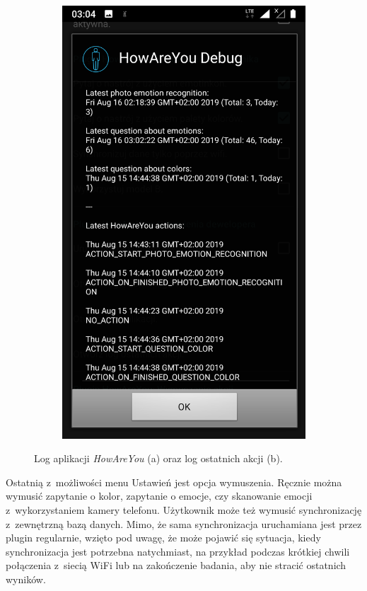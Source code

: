 \begin{figure}[H]
\begin{subfigure}{0.35\textwidth}
		\includegraphics[scale=0.13]{rozdzial3/Ustawienia_logOstatnichAkcji.png}
		\subcaption{\label{subfigure_b}}
	\end{subfigure}
	\caption{ Log aplikacji \textit{HowAreYou} (a) oraz log ostatnich akcji (b).}
\end{figure}

Ostatnią z~możliwości menu Ustawień jest opcja wymuszenia. Ręcznie można wymusić zapytanie o kolor, zapytanie o emocje, czy skanowanie emocji z~wykorzystaniem kamery telefonu. Użytkownik może też wymusić synchronizację z~zewnętrzną bazą danych. Mimo, że sama synchronizacja uruchamiana jest przez plugin regularnie, wzięto pod uwagę, że może pojawić się sytuacja, kiedy synchronizacja jest potrzebna natychmiast, na przykład podczas krótkiej chwili połączenia z~siecią WiFi lub na zakończenie badania, aby nie stracić ostatnich wyników.



